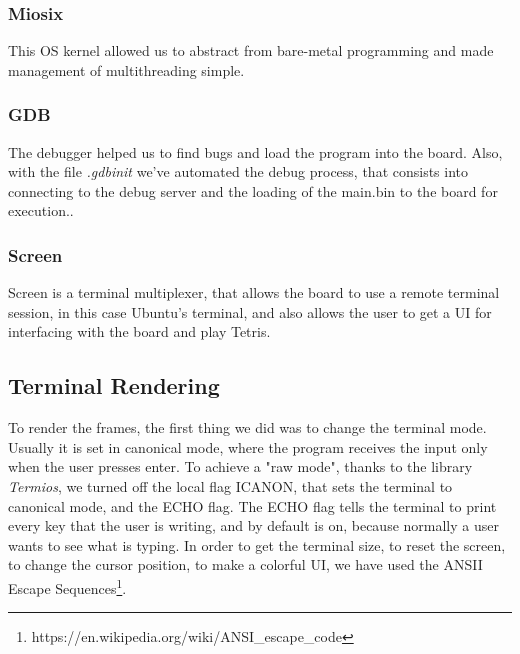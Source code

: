 \documentclass{article}
\begin{document}
\subsubsection{Miosix}
This OS kernel allowed us to abstract from bare-metal programming and made management of multithreading simple\cite{slidebaremetal}\cite{osprogramming}.
\subsubsection{GDB}
The debugger helped us to find bugs and load the program into the board. Also, with the file \emph{.gdbinit} we've automated the debug process, that consists into connecting to the debug server and the loading of the main.bin to the board for execution..
\subsubsection{Screen}
Screen is a terminal multiplexer, that allows the board to use a remote terminal session, in this case Ubuntu's terminal, and also allows the user to get a UI for interfacing with the board and play Tetris.
 
\subsection{Terminal Rendering}
\label{terminal-rendering}
To render the frames, the first thing we did was to change the terminal mode. Usually it is set in canonical mode, where the program receives the input only when the user presses enter.
To achieve a "raw mode", thanks to the library \textit{Termios}, we turned off the local flag ICANON, that sets the terminal to canonical mode, and the ECHO flag.
The ECHO flag tells the terminal to print every key that the user is writing, and by default is on, because normally a user wants to see what is typing.
In order to get the terminal size, to reset the screen, to change the cursor position, to make a colorful UI, we have used the ANSII Escape Sequences\footnote{https://en.wikipedia.org/wiki/ANSI\_escape\_code}. 
\end{document}
